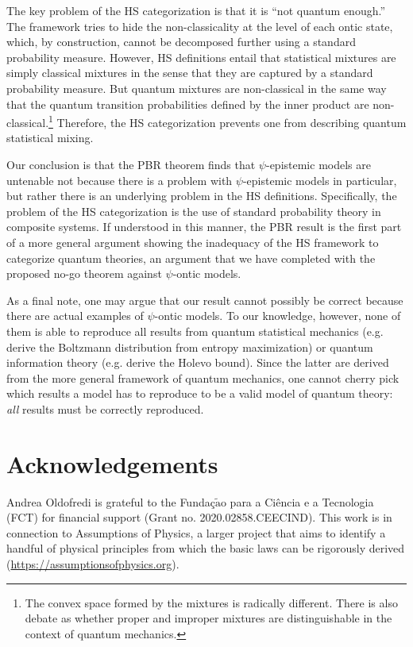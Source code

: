 \documentclass[10pt,twocolumn, nofootinbib]{revtex4-2}
\begin{document}
The key problem of the HS categorization is that it is ``not quantum enough.'' The framework tries to hide the non-classicality at the level of each ontic state, which, by construction, cannot be decomposed further using a standard probability measure. However, HS definitions entail that statistical mixtures are simply classical mixtures in the sense that they are captured by a standard probability measure. But quantum mixtures are non-classical in the same way that the quantum transition probabilities defined by the inner product are non-classical.\footnote{The convex space formed by the mixtures is radically different\cite{bengtsson_życzkowski_2017}. There is also debate as whether proper and improper mixtures are distinguishable in the context of quantum mechanics\cite{Kirkpatrick:2001,DEspagnat:2001}.} Therefore, the HS categorization prevents one from describing quantum statistical mixing.

Our conclusion is that the PBR theorem finds that $\psi$-epistemic models are untenable not because there is a problem with $\psi$-epistemic models in particular, but rather there is an underlying problem in the HS definitions. Specifically, the problem of the HS categorization is the use of standard probability theory in composite systems. If understood in this manner, the PBR result is the first part of a more general argument showing the inadequacy of the HS framework to categorize quantum theories, an argument that we have completed with the proposed no-go theorem against $\psi$-ontic models.

As a final note, one may argue that our result cannot possibly be correct because there are actual examples of $\psi$-ontic models. To our knowledge, however, none of them is able to reproduce all results from quantum statistical mechanics (e.g. derive the Boltzmann distribution from entropy maximization) or quantum information theory (e.g. derive the Holevo bound). Since the latter are derived from the more general framework of quantum mechanics, one cannot cherry pick which results a model has to reproduce to be a valid model of quantum theory: \emph{all} results must be correctly reproduced.

\section{Acknowledgements}

Andrea Oldofredi is grateful to the Funda\c{c}$\tilde{\mathrm{a}}$o para a Ci\^encia e a Tecnologia (FCT) for financial support (Grant no. 2020.02858.CEECIND).  This work is in connection to Assumptions of Physics, a larger project that aims to identify a handful of physical principles from which the basic laws can be rigorously derived  (\url{https://assumptionsofphysics.org}).
\end{document}

